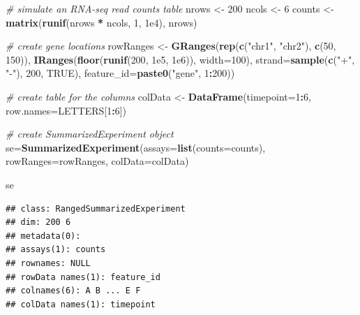 \documentclass[12pt,]{krantz}
\newenvironment{Shaded}{\begin{snugshade}}{\end{snugshade}}
\newcommand{\CommentTok}[1]{\textcolor[rgb]{0.56,0.35,0.01}{\textit{#1}}}
\newcommand{\DataTypeTok}[1]{\textcolor[rgb]{0.13,0.29,0.53}{#1}}
\newcommand{\DecValTok}[1]{\textcolor[rgb]{0.00,0.00,0.81}{#1}}
\newcommand{\FloatTok}[1]{\textcolor[rgb]{0.00,0.00,0.81}{#1}}
\newcommand{\KeywordTok}[1]{\textcolor[rgb]{0.13,0.29,0.53}{\textbf{#1}}}
\newcommand{\NormalTok}[1]{#1}
\newcommand{\OperatorTok}[1]{\textcolor[rgb]{0.81,0.36,0.00}{\textbf{#1}}}
\newcommand{\OtherTok}[1]{\textcolor[rgb]{0.56,0.35,0.01}{#1}}
\newcommand{\StringTok}[1]{\textcolor[rgb]{0.31,0.60,0.02}{#1}}
\begin{document}
\begin{Shaded}
\begin{Highlighting}[]
\CommentTok{# simulate an RNA-seq read counts table}
\NormalTok{nrows <-}\StringTok{ }\DecValTok{200}
\NormalTok{ncols <-}\StringTok{ }\DecValTok{6}
\NormalTok{counts <-}\StringTok{ }\KeywordTok{matrix}\NormalTok{(}\KeywordTok{runif}\NormalTok{(nrows }\OperatorTok{*}\StringTok{ }\NormalTok{ncols, }\DecValTok{1}\NormalTok{, }\FloatTok{1e4}\NormalTok{), nrows)}

\CommentTok{# create gene locations}
\NormalTok{rowRanges <-}\StringTok{ }\KeywordTok{GRanges}\NormalTok{(}\KeywordTok{rep}\NormalTok{(}\KeywordTok{c}\NormalTok{(}\StringTok{"chr1"}\NormalTok{, }\StringTok{"chr2"}\NormalTok{), }\KeywordTok{c}\NormalTok{(}\DecValTok{50}\NormalTok{, }\DecValTok{150}\NormalTok{)),}
                     \KeywordTok{IRanges}\NormalTok{(}\KeywordTok{floor}\NormalTok{(}\KeywordTok{runif}\NormalTok{(}\DecValTok{200}\NormalTok{, }\FloatTok{1e5}\NormalTok{, }\FloatTok{1e6}\NormalTok{)), }\DataTypeTok{width=}\DecValTok{100}\NormalTok{),}
                     \DataTypeTok{strand=}\KeywordTok{sample}\NormalTok{(}\KeywordTok{c}\NormalTok{(}\StringTok{"+"}\NormalTok{, }\StringTok{"-"}\NormalTok{), }\DecValTok{200}\NormalTok{, }\OtherTok{TRUE}\NormalTok{),}
                     \DataTypeTok{feature_id=}\KeywordTok{paste0}\NormalTok{(}\StringTok{"gene"}\NormalTok{, }\DecValTok{1}\OperatorTok{:}\DecValTok{200}\NormalTok{))}

\CommentTok{# create table for the columns}
\NormalTok{colData <-}\StringTok{ }\KeywordTok{DataFrame}\NormalTok{(}\DataTypeTok{timepoint=}\DecValTok{1}\OperatorTok{:}\DecValTok{6}\NormalTok{,}
                     \DataTypeTok{row.names=}\NormalTok{LETTERS[}\DecValTok{1}\OperatorTok{:}\DecValTok{6}\NormalTok{])}


\CommentTok{# create SummarizedExperiment object}
\NormalTok{se=}\KeywordTok{SummarizedExperiment}\NormalTok{(}\DataTypeTok{assays=}\KeywordTok{list}\NormalTok{(}\DataTypeTok{counts=}\NormalTok{counts),}
                     \DataTypeTok{rowRanges=}\NormalTok{rowRanges, }\DataTypeTok{colData=}\NormalTok{colData)}

\NormalTok{se}
\end{Highlighting}
\end{Shaded}

\begin{verbatim}
## class: RangedSummarizedExperiment 
## dim: 200 6 
## metadata(0):
## assays(1): counts
## rownames: NULL
## rowData names(1): feature_id
## colnames(6): A B ... E F
## colData names(1): timepoint
\end{verbatim}
\end{document}
